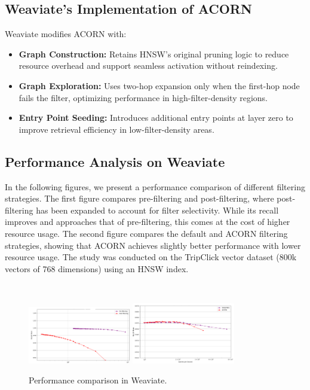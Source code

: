 \subsection{Weaviate's Implementation of ACORN}
Weaviate modifies ACORN with:
\begin{itemize}
    \item 	\textbf{Graph Construction:} Retains HNSW’s original pruning logic to reduce resource overhead and support seamless activation without reindexing.
    \item 	\textbf{Graph Exploration:} Uses two-hop expansion only when the first-hop node fails the filter, optimizing performance in high-filter-density regions.
    \item 	\textbf{Entry Point Seeding:} Introduces additional entry points at layer zero to improve retrieval efficiency in low-filter-density areas.
    \end{itemize}
\subsection{Performance Analysis on Weaviate}
In the following figures, we present a performance comparison of different filtering strategies. The first figure compares pre-filtering and post-filtering, where post-filtering has been expanded to account for filter selectivity. While its recall improves and approaches that of pre-filtering, this comes at the cost of higher resource usage. 
The second figure compares the default and ACORN filtering strategies, showing that ACORN achieves slightly better performance with lower resource usage. The study was conducted on the TripClick vector dataset (800k vectors of 768 dimensions) using an HNSW index.

\
\begin{figure}[h]
    \centering
    \includegraphics[width=0.4\textwidth]{IMAGES/immagine_2025-03-03_154956860.png}
    \includegraphics[width=0.4\textwidth]{IMAGES/immagine_2025-03-03_150720257.png}
    \caption{Performance comparison in Weaviate.}
    \label{fig:Weaviate}
\end{figure}
